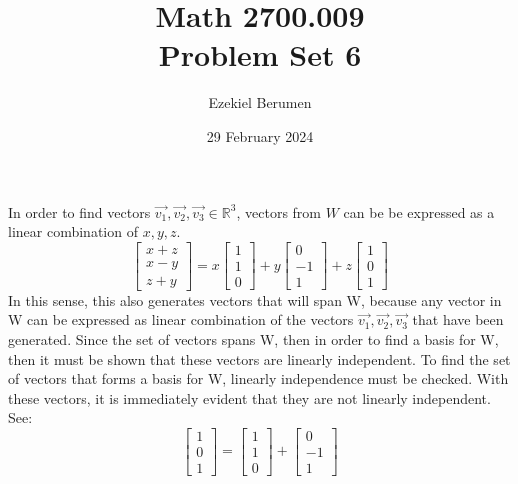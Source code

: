\documentclass{report}
\title{\Huge{Math 2700.009}\\Problem Set 6}
\author{\huge{Ezekiel Berumen}}
\date{29 February 2024}
\begin{document}
\maketitle
\newpage

\sol In order to find vectors $\vec{v_1},\vec{v_2},\vec{v_3} \in \mathbb{R}^3$, vectors from $W$ can be be expressed as a linear combination of $x,y,z$.
$$
\begin{bmatrix} x + z \\ x - y \\ z + y \end{bmatrix} =
x \begin{bmatrix} 1 \\ 1 \\ 0 \end{bmatrix} +
y \begin{bmatrix} 0 \\ -1 \\ 1 \end{bmatrix} +
z \begin{bmatrix} 1 \\ 0 \\ 1 \end{bmatrix}
$$
In this sense, this also generates vectors that will span W, because any vector in W can be expressed as linear combination of the vectors $\vec{v_1},\vec{v_2},\vec{v_3}$ that have been generated. Since the set of vectors spans W, then in order to find a basis for W, then it must be shown that these vectors are linearly independent. To find the set of vectors that forms a basis for W, linearly independence must be checked. With these vectors, it is immediately evident that they are not linearly independent. See:
$$
\begin{bmatrix} 1 \\ 0 \\ 1 \end{bmatrix} =
\begin{bmatrix} 1 \\ 1 \\ 0 \end{bmatrix} +
\begin{bmatrix} 0 \\ -1 \\ 1 \end{bmatrix}
$$
\end{document}
